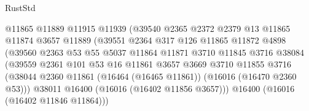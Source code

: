 \begin{lexlean}{RustStd}
\begin{coremodule}
                                      @11865
                                      @11889
                                      @11915
                                      @11939
                                      (@39540
                                        @2365
                                        @2372
                                        @2379
                                        @13
                                        @11865
                                        @11874
                                        @3657
                                        @11889
                                        (@39551
                                          @2364
                                          @317
                                          @126
                                          @11865
                                          @11872
                                          @4898
                                          (@39560
                                            @2363
                                            @53
                                            @55
                                            @5037
                                            @11864
                                            @11871
                                            @3710
                                            @11845
                                            @3716
                                            @38084
                                            (@39559
                                              @2361
                                              @101
                                              @53
                                              @16
                                              @11861
                                              @3657
                                              @3669
                                              @3710
                                              @11855
                                              @3716
                                              (@38044
                                                @2360
                                                @11861
                                                (@16464 (@16465 @11861))
                                                (@16016 (@16470 @2360 @53)))
                                              @38011
                                              @16400
                                              (@16016 (@16402 @11856 @3657)))
                                            @16400
                                            (@16016 (@16402 @11846 @11864)))

\end{coremodule}
\end{lexlean}
